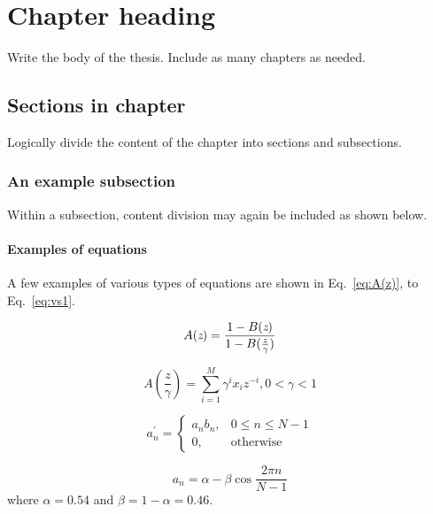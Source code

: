 

\chapter{Chapter heading}
\indent Write the body of the thesis. Include as many chapters as needed.


\section{Sections in chapter}

Logically divide the content of the chapter into sections and subsections. 


\subsection{An example subsection}

Within a subsection, content division may again be included as shown below.

\subsubsection{Examples of equations}

\indent  A few examples of various types of equations are shown in Eq.~\ref{eq:A(z)}, to Eq.~\ref{eq:vs1}.

\begin{equation}
  	A(\emph{z})= \frac{1-B(\emph{z})}{1-B(\frac{z}{\gamma})}
  	\label{eq:A(z)}
\end{equation}

\begin{equation}
	A(\frac{z}{\gamma})=\sum\limits_{i=1}^M \gamma^{i} x_{i}z^{-i}, 0 < \gamma < 1
  	\label{eq:A(z/gamma)}
\end{equation}

\begin{equation}
  	a_{n}^{'}=
	\begin{cases}

	a_{n}b_{n},& 0\le{n}\le{N-1}\\
   	 0,              & \text{otherwise}
	\end{cases}
  \label{eq:andash}
  \end{equation}


\begin{equation}
  a_{n}= \alpha - \beta \cos \frac{2 \pi n}{N-1}
  \label{eq:an}
  \end{equation}
where \(\alpha = 0.54\) and \(\beta = 1-\alpha = 0.46\).



